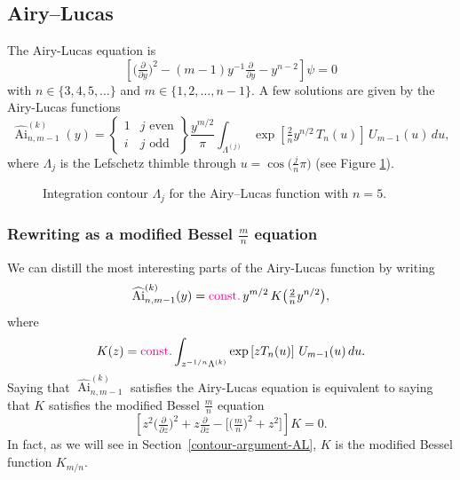 \documentclass{article}
\theoremstyle{definition}
\DeclareMathOperator{\Ai}{Ai}
\begin{document}
\subsection{Airy--Lucas}
The Airy-Lucas equation is
\begin{equation}\label{eqn:airy-lucas}
\left[\big(\tfrac{\partial}{\partial y}\big)^2 - (m-1) y^{-1} \tfrac{\partial}{\partial y} - y^{n-2}\right] \psi = 0
\end{equation}
with $n \in \{3, 4, 5, \ldots\}$ and $m \in \{1, 2, \ldots, n-1\}$. A few solutions are given by the Airy-Lucas functions~\cite[equation~3.6]{charbonnier22}
\[ \widehat{\Ai}^{(k)}_{n, m-1}(y) = \left\{\begin{array}{ll}1 & j \text{ even} \\ i & j \text{ odd}\end{array}\right\} \frac{y^{m/2}}{\pi} \int_{\Lambda^{(j)}} \exp\left[\tfrac{2}{n} y^{n/2}\,T_n(u)\right]\,U_{m-1}(u)\,du, \]
where $\Lambda_{j}$ is the Lefschetz thimble through $u = \cos\big(\tfrac{j}{n}\pi\big)$ (see Figure \ref{fig:thimble_n_5}).

\begin{figure}[h]
    \centering
    \caption{Integration contour $\Lambda_j$ for the Airy--Lucas function with $n=5$.}
    \label{fig:thimble_n_5}
\end{figure}


\subsubsection{Rewriting as a modified Bessel $\frac{m}{n}$ equation}
We can distill the most interesting parts of the Airy-Lucas function by writing
\[ \widehat{\Ai}^{(k)}_{n, m-1}(y) = \textcolor{magenta}{\text{const.}}\,y^{{m/2}}\,K\big(\tfrac{2}{n} y^{n/2}\big), \]
where
\begin{equation}\label{integral:mod-bessel-rational-AL}
K(z) = \textcolor{magenta}{\text{const.}} \int_{z^{-{1/n}}\Lambda^{(k)}} \exp\left[z T_n(u)\right]\,U_{m-1}(u)\,du.
\end{equation}
Saying that $\widehat{\Ai}^{(k)}_{n, m-1}$ satisfies the Airy-Lucas equation is equivalent to saying that $K$ satisfies the modified Bessel $\frac{m}{n}$ equation
\begin{equation}\label{eqn:mod-bessel-AL}
\left[z^2 \big(\tfrac{\partial}{\partial z}\big)^2 + z \tfrac{\partial}{\partial z} - \big[\big(\tfrac{m}{n} \big)^2 + z^2\big]\right] K = 0.
\end{equation}
In fact, as we will see in Section~\ref{contour-argument-AL}, $K$ is the modified Bessel function $K_{{m/n}}$.
\end{document}
